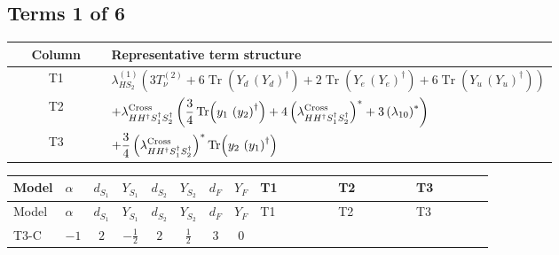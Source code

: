 \documentclass[8pt]{article}
\begin{document}
\begin{landscape}
\subsection*{Terms 1 of 6}
\begin{center}
\begin{tabular}{@{}c >{\raggedright\arraybackslash}p{0.82\linewidth}@{}}
\toprule
Column & Representative term structure \\
\midrule
T1 & \(\displaystyle {\lambda_{HS_2}^{(1)}} (3 T_{\nu}^{(2)}+6 \operatorname{Tr}\!\left({Y_d}\,\left({Y_d}\right)^{\dagger}\right)+2 \operatorname{Tr}\!\left({Y_e}\,\left({Y_e}\right)^{\dagger}\right)+6 \operatorname{Tr}\!\left({Y_u}\,\left({Y_u}\right)^{\dagger}\right))\) \\
\midrule
T2 & \(\displaystyle +{\lambda_{H H^\dagger S_1^\dagger S_2^\dagger}^{\rm Cross}} \left(\frac{3}{4} \operatorname{Tr}\!\left({y_1}\,\left({y_2}\right)^{\dagger}\right)+4 \left({\lambda_{H H^\dagger S_1^\dagger S_2^\dagger}^{\rm Cross}}\right)^{*}+3 \left({\lambda_{10}}\right)^{*}\right)\) \\
\midrule
T3 & \(\displaystyle +\frac{3}{4} \left({\lambda_{H H^\dagger S_1^\dagger S_2^\dagger}^{\rm Cross}}\right)^{*} \operatorname{Tr}\!\left({y_2}\,\left({y_1}\right)^{\dagger}\right)\) \\
\midrule
\bottomrule
\end{tabular}
\end{center}
\smallskip
\tiny
\begin{longtable}{@{}llcccccc >{\raggedright\arraybackslash}p{0.21\linewidth} >{\raggedright\arraybackslash}p{0.21\linewidth} >{\raggedright\arraybackslash}p{0.21\linewidth}@{}}
\toprule
Model & $\alpha$ & $d_{S_1}$ & $Y_{S_1}$ & $d_{S_2}$ & $Y_{S_2}$ & $d_F$ & $Y_F$ & T1 & T2 & T3 \\
\midrule
\endfirsthead
\toprule
Model & $\alpha$ & $d_{S_1}$ & $Y_{S_1}$ & $d_{S_2}$ & $Y_{S_2}$ & $d_F$ & $Y_F$ & T1 & T2 & T3 \\
\midrule
\endhead
T3-C & $-1$ & $2$ & $-\frac{1}{2}$ & $2$ & $\frac{1}{2}$ & $3$ & $0$ & \scriptsize\adjustbox{max width=\linewidth}{$\begin{gathered} {\lambda_{HS_2}^{(1)}} (3 T_{\nu}^{(2)}+6 \operatorname{Tr}\!\left({Y_d}\,\left({Y_d}\right)^{\dagger}\right)+2 \operatorname{Tr}\!\left({Y_e}\,\left({Y_e}\right)^{\dagger}\right)+6 \operatorname{Tr}\!\left({Y_u}\,\left({Y_u}\right)^{\dagger}\right))\end{gathered}$} & \scriptsize\adjustbox{max width=\linewidth}{$\begin{gathered} +{\lambda_{H H^\dagger S_1^\dagger S_2^\dagger}^{\rm Cross}} \left(\frac{3}{4} \operatorname{Tr}\!\left({y_1}\,\left({y_2}\right)^{\dagger}\right)+4 \left({\lambda_{H H^\dagger S_1^\dagger S_2^\dagger}^{\rm Cross}}\right)^{*}+3 \left({\lambda_{10}}\right)^{*}\right)\end{gathered}$} & \scriptsize\adjustbox{max width=\linewidth}{$\begin{gathered} +\frac{3}{4} \left({\lambda_{H H^\dagger S_1^\dagger S_2^\dagger}^{\rm Cross}}\right)^{*} \operatorname{Tr}\!\left({y_2}\,\left({y_1}\right)^{\dagger}\right)\end{gathered}$} \\

\end{longtable}
\end{landscape}
\end{document}
